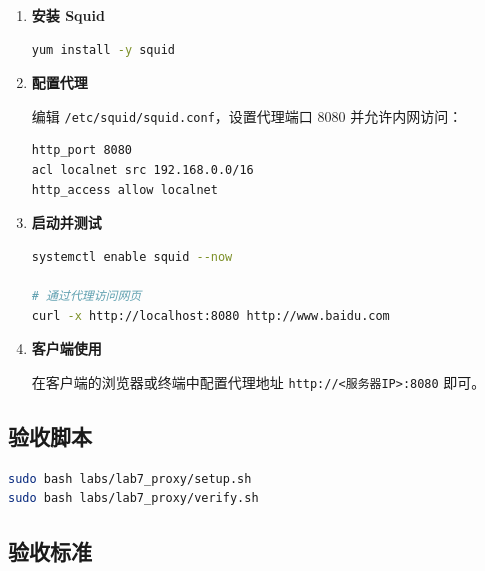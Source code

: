 \documentclass[12pt,a4paper]{ctexart}
\begin{document}
\begin{enumerate}[label=\arabic*.,leftmargin=*]

  \item \textbf{安装 Squid}

  \begin{cmdbox}
  \begin{lstlisting}[language=bash]
yum install -y squid
  \end{lstlisting}
  \end{cmdbox}

  \item \textbf{配置代理}

  编辑 \texttt{/etc/squid/squid.conf}，设置代理端口 8080 并允许内网访问：

  \begin{cmdbox}
  \begin{lstlisting}[language=bash]
http_port 8080
acl localnet src 192.168.0.0/16
http_access allow localnet
  \end{lstlisting}
  \end{cmdbox}

  \item \textbf{启动并测试}

  \begin{cmdbox}
  \begin{lstlisting}[language=bash]
systemctl enable squid --now

# 通过代理访问网页
curl -x http://localhost:8080 http://www.baidu.com
  \end{lstlisting}
  \end{cmdbox}

  \item \textbf{客户端使用}

  在客户端的浏览器或终端中配置代理地址 \texttt{http://<服务器IP>:8080} 即可。

\end{enumerate}

\subsection{验收脚本}

\begin{cmdbox}
\begin{lstlisting}[language=bash]
sudo bash labs/lab7_proxy/setup.sh
sudo bash labs/lab7_proxy/verify.sh
\end{lstlisting}
\end{cmdbox}

\subsection{验收标准}
\end{document}
